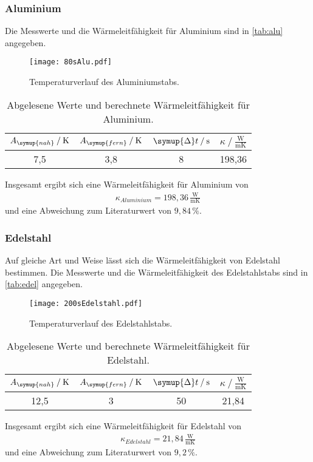 \subsubsection{Aluminium}
Die Messwerte und die Wärmeleitfähigkeit für Aluminium sind in \autoref{tab:alu} angegeben.
\begin{figure}[h]
  \centering
  \texttt{[image: 80sAlu.pdf]}
  \caption{Temperaturverlauf des Aluminiumstabs.}
  \label{fig:80sAlu}
\end{figure}

\begin{table}[h]
  \centering
  \caption{Abgelesene Werte und berechnete Wärmeleitfähigkeit für Aluminium.}
  \label{tab:alu}
  \begin{tabular}{c c c c}
    \toprule
    $A_{\symup{nah}}\mathbin{/}\si{\kelvin}$ & $A_{\symup{fern}}\mathbin{/}\si{\kelvin}$ & $\symup{\Delta}t\mathbin{/}\si{\second}$ & $\kappa\mathbin{/}\frac{\si{\watt}}{\si{\meter \kelvin}}$ \\
    \midrule
    7,5 & 3,8 & 8 & 198,36\\
    \bottomrule
  \end{tabular}
\end{table}

Insgesamt ergibt sich eine Wärmeleitfähigkeit für Aluminium von
\begin{align*}
  \kappa_{Aluminium} = 198,36\,\frac{\si{\watt}}{\si{\meter \kelvin}}
\end{align*}
und eine Abweichung zum Literaturwert von $9,84\,\%$.

\subsubsection{Edelstahl}
Auf gleiche Art und Weise lässt sich die Wärmeleitfähigkeit von Edelstahl bestimmen. Die Messwerte und die Wärmeleitfähigkeit des Edelstahlstabs sind in \autoref{tab:edel} angegeben.
\begin{figure}[h]
  \centering
  \texttt{[image: 200sEdelstahl.pdf]}
  \caption{Temperaturverlauf des Edelstahlstabs.}
  \label{fig:200sEdelstahl}
\end{figure}

\begin{table}[h]
  \centering
  \caption{Abgelesene Werte und berechnete Wärmeleitfähigkeit für Edelstahl.}
  \label{tab:edel}
  \begin{tabular}{c c c c}
    \toprule
    $A_{\symup{nah}}\mathbin{/}\si{\kelvin}$ & $A_{\symup{fern}}\mathbin{/}\si{\kelvin}$ & $\symup{\Delta}t\mathbin{/}\si{\second}$ & $\kappa\mathbin{/}\frac{\si{\watt}}{\si{\meter \kelvin}}$ \\
    \midrule
    12,5 & 3 & 50 & 21,84\\
    \bottomrule
  \end{tabular}
\end{table}

Insgesamt ergibt sich eine Wärmeleitfähigkeit für Edelstahl von
\begin{align*}
  \kappa_{Edelstahl} = 21,84\,\frac{\si{\watt}}{\si{\meter \kelvin}}
\end{align*}
und eine Abweichung zum Literaturwert von $9,2\,\%$.
